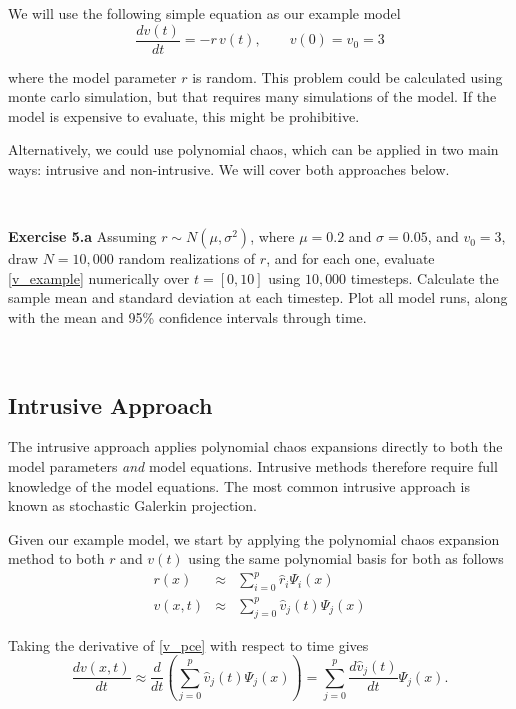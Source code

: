\documentclass[11pt]{article}
\numberwithin{equation}{section}
\begin{document}
We will use the following simple equation as our example model
\begin{equation}
\frac{dv(t)}{dt} = - r \, v(t), \qquad v(0) = v_0 = 3 \label{v_example}
\end{equation}

where the model parameter $r$ is random. This problem could be calculated using monte carlo simulation, but that requires many simulations of the model. If the model is expensive to evaluate, this might be prohibitive.

\qquad Alternatively, we could use polynomial chaos, which can be applied in two main ways: intrusive and non-intrusive. We will cover both approaches below.


\

\textbf{Exercise 5.a} Assuming $r \sim N(\mu, \sigma^2)$, where $\mu = 0.2$ and $\sigma = 0.05$, and $v_0 = 3$, draw $N = 10,000$ random realizations of $r$, and for each one, evaluate \eqref{v_example} numerically over $t = [0, 10]$ using $10,000$ timesteps. Calculate the sample mean and standard deviation at each timestep. Plot all model runs, along with the mean and 95\% confidence intervals through time.

\




\subsection{Intrusive Approach}

The intrusive approach applies polynomial chaos expansions directly to both the model parameters {\em and} model equations. Intrusive methods therefore require full knowledge of the model equations. The most common intrusive approach is known as stochastic Galerkin projection.

\qquad Given our example model, we start by applying the polynomial chaos expansion method to both $r$ and $v(t)$ using the same polynomial basis for both as follows
\begin{eqnarray}
r(x) & \approx & \sum_{i=0}^p \hat{r}_i \Psi_i(x) \label{alpha_pce} \\
v(x, t) & \approx & \sum_{j=0}^p \hat{v}_j(t) \Psi_j(x) \label{v_pce}
\end{eqnarray}

Taking the derivative of \eqref{v_pce} with respect to time gives 
\begin{equation}
\frac{dv(x, t)}{dt} \approx \frac{d}{dt} \left( \sum_{j=0}^p \hat{v}_j(t) \Psi_j(x) \right) = \sum_{j=0}^p \frac{d \hat{v}_j(t)}{dt} \Psi_j(x). \label{dv_pce}
\end{equation}
\end{document}
